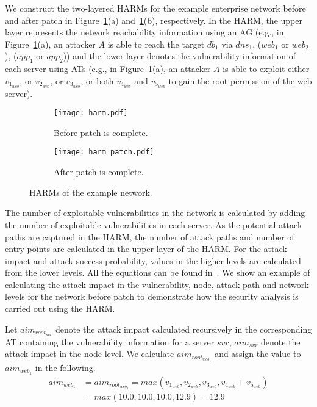 \documentclass[conference]{IEEEtran}
\begin{document}
We construct the two-layered HARMs for the example enterprise network before and after patch in Figure~\ref{fig_harm}(a) and~\ref{fig_harm}(b), respectively. In the HARM, the upper layer represents the network reachability information using an AG (e.g., in Figure~\ref{fig_harm}(a), an attacker $A$ is able to reach the target $\mathit{db}_1$ via $\mathit{dns}_1$, ($\mathit{web}_1$ or $\mathit{web}_2$), ($\mathit{app}_1$ or $\mathit{app}_2$)) and the lower layer denotes the vulnerability information of each server using ATs (e.g., in Figure~\ref{fig_harm}(a), an attacker $A$ is able to exploit either $v_{1_{\mathit{web}}}$, or $v_{2_{\mathit{web}}}$, or $v_{3_{\mathit{web}}}$, or both $v_{4_{\mathit{web}}}$ and $v_{5_{\mathit{web}}}$ to gain the root permission of the web server).
\begin{figure}[hbt]
    \centering
    \begin{subfigure}{0.45\textwidth}
            \texttt{[image: harm.pdf]}
            \caption{Before patch is complete.}
    \end{subfigure}
    \begin{subfigure}{0.275\textwidth}
            \texttt{[image: harm\_patch.pdf]}
            \caption{After patch is complete.}
    \end{subfigure}
    \caption{HARMs of the example network.}
    \label{fig_harm}
\end{figure}

The number of exploitable vulnerabilities in the network is calculated by adding the number of exploitable vulnerabilities in each server. As the potential attack paths are captured in the HARM,   the number of attack paths and number of entry points are calculated in the upper layer of the HARM. For the attack impact and attack success probability, values in the higher levels are calculated from the lower levels. All the equations can be found in~\cite{Ge2017JNCA,Yusuf2016CIT,Moon2016CIT}. We show an example of calculating the attack impact in the vulnerability, node, attack path and network levels for the network before patch to demonstrate how the security analysis is carried out using the HARM.

Let $\mathit{aim}_{\mathit{root}_{\mathit{svr}}}$ denote the attack impact calculated recursively in the corresponding AT containing the vulnerability information for a server $svr$, $\mathit{aim}_{\mathit{svr}}$ denote the attack impact in the node level. We calculate $\mathit{aim}_{\mathit{root}_{\mathit{web}_1}}$ and assign the value to $\mathit{aim}_{\mathit{web}_1}$ in the following.
\begin{align*} 
\mathit{aim}_{\mathit{web}_1}&=\mathit{aim}_{\mathit{root}_{\mathit{web}_1}}=max(v_{1_{\mathit{web}}},v_{2_{\mathit{web}}},v_{3_{\mathit{web}}},v_{4_{\mathit{web}}}+v_{5_{\mathit{web}}}) \\
&=max(10.0,10.0,10.0,12.9)=12.9
\end{align*}
\end{document}
